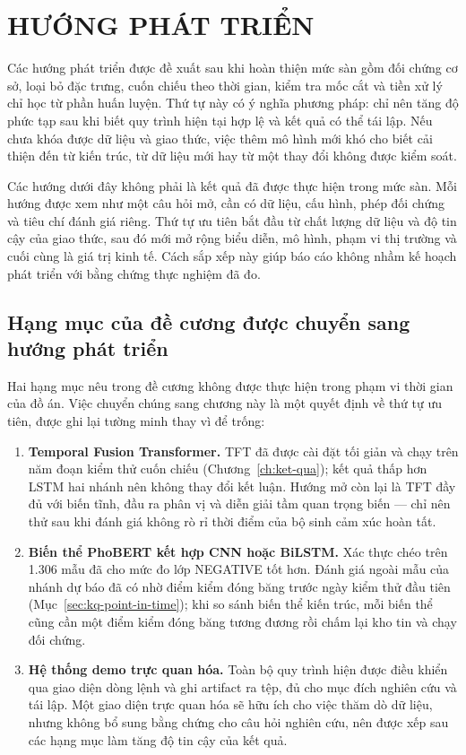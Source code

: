 \chapter{HƯỚNG PHÁT TRIỂN}
\label{ch:huong-phat-trien}

Các hướng phát triển được đề xuất sau khi hoàn thiện mức sàn gồm đối chứng cơ sở, loại bỏ đặc trưng,
cuốn chiếu theo thời gian, kiểm tra mốc cắt và tiền xử lý chỉ học từ phần huấn luyện. Thứ tự này có
ý nghĩa phương pháp: chỉ nên tăng độ phức tạp sau khi biết quy trình hiện tại hợp lệ và
kết quả có thể tái lập. Nếu chưa khóa được dữ liệu và giao thức, việc thêm mô hình mới
khó cho biết cải thiện đến từ kiến trúc, từ dữ liệu mới hay từ một thay đổi không được
kiểm soát.

Các hướng dưới đây không phải là kết quả đã được thực hiện trong mức sàn. Mỗi hướng
được xem như một câu hỏi mở, cần có dữ liệu, cấu hình, phép đối chứng và tiêu chí đánh
giá riêng. Thứ tự ưu tiên bắt đầu từ chất lượng dữ liệu và độ tin cậy của giao thức,
sau đó mới mở rộng biểu diễn, mô hình, phạm vi thị trường và cuối cùng là giá trị kinh
tế. Cách sắp xếp này giúp báo cáo không nhầm kế hoạch phát triển với bằng chứng thực
nghiệm đã đo.

\section{Hạng mục của đề cương được chuyển sang hướng phát triển}
\label{sec:hpt-chuyen}

Hai hạng mục nêu trong đề cương không được thực hiện trong phạm vi thời gian của đồ án. Việc
chuyển chúng sang chương này là một quyết định về thứ tự ưu tiên, được ghi lại tường minh
thay vì để trống:

\begin{enumerate}[nosep]
  \item \textbf{Temporal Fusion Transformer.} TFT đã được cài đặt tối giản và chạy trên
        năm đoạn kiểm thử cuốn chiếu (Chương~\ref{ch:ket-qua}); kết quả thấp hơn LSTM hai
        nhánh nên không thay đổi kết luận. Hướng mở còn lại là TFT đầy đủ với biến tĩnh,
        đầu ra phân vị và diễn giải tầm quan trọng biến — chỉ nên thử sau khi đánh giá
        không rò rỉ thời điểm của bộ sinh cảm xúc hoàn tất.
  \item \textbf{Biến thể PhoBERT kết hợp CNN hoặc BiLSTM.} Xác thực chéo trên 1.306 mẫu
        đã cho mức đo lớp NEGATIVE tốt hơn. Đánh giá ngoài mẫu của nhánh dự báo đã có
        nhờ điểm kiểm đóng băng trước ngày kiểm thử đầu tiên
        (Mục~\ref{sec:kq-point-in-time}); khi so sánh biến thể kiến trúc, mỗi biến thể
        cũng cần một điểm kiểm đóng băng tương đương rồi chấm lại kho tin và chạy đối
        chứng.
  \item \textbf{Hệ thống demo trực quan hóa.} Toàn bộ quy trình hiện được điều khiển qua
        giao diện dòng lệnh và ghi artifact ra tệp, đủ cho mục đích nghiên cứu và tái lập.
        Một giao diện trực quan hóa sẽ hữu ích cho việc thăm dò dữ liệu, nhưng không bổ sung
        bằng chứng cho câu hỏi nghiên cứu, nên được xếp sau các hạng mục làm tăng độ tin cậy
        của kết quả.
\end{enumerate}

